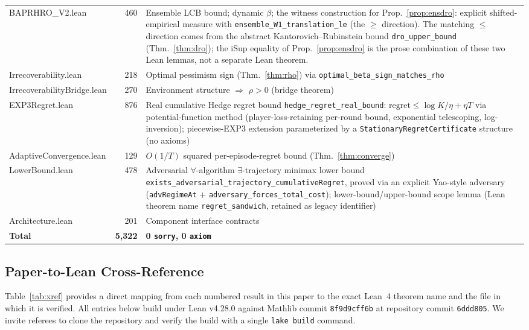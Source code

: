 \documentclass[11pt]{article}
\theoremstyle{definition}
\theoremstyle{remark}
\begin{document}
\begin{table}[!htbp]
\begin{tabular}{lrp{8.4cm}}
BAPRHRO\_V2.lean & 460 & Ensemble LCB bound; dynamic $\beta$; the witness construction for Prop.~\ref{prop:ensdro}: explicit shifted-empirical measure with \texttt{ensemble\_W1\_translation\_le} (the $\geq$ direction). The matching $\leq$ direction comes from the abstract Kantorovich--Rubinstein bound \texttt{dro\_upper\_bound} (Thm.~\ref{thm:dro}); the iSup equality of Prop.~\ref{prop:ensdro} is the prose combination of these two Lean lemmas, not a separate Lean theorem. \\
Irrecoverability.lean & 218 & Optimal pessimism sign (Thm.~\ref{thm:rho}) via \texttt{optimal\_beta\_sign\_matches\_rho} \\
IrrecoverabilityBridge.lean & 270 & Environment structure $\Rightarrow$ $\rho > 0$ (bridge theorem) \\
EXP3Regret.lean & 876 & Real cumulative Hedge regret bound \texttt{hedge\_regret\_real\_bound}: $\mathrm{regret} \leq \log K / \eta + \eta T$ via potential-function method (player-loss-retaining per-round bound, exponential telescoping, log-inversion); piecewise-EXP3 extension parameterized by a \texttt{StationaryRegretCertificate} structure (no axioms) \\
AdaptiveConvergence.lean & 129 & $O(1/T)$ squared per-episode-regret bound (Thm.~\ref{thm:converge}) \\
LowerBound.lean & 478 & Adversarial $\forall$-algorithm $\exists$-trajectory minimax lower bound \texttt{exists\_adversarial\_trajectory\_cumulativeRegret}, proved via an explicit Yao-style adversary (\texttt{advRegimeAt} + \texttt{adversary\_forces\_total\_cost}); lower-bound/upper-bound scope lemma (Lean theorem name \texttt{regret\_sandwich}, retained as legacy identifier) \\
Architecture.lean & 201 & Component interface contracts \\
\midrule
\textbf{Total} & \textbf{5{,}322} & \textbf{0 \texttt{sorry}, 0 \texttt{axiom}} \\
\bottomrule
\end{tabular}
\end{table}

\subsection{Paper-to-Lean Cross-Reference}
\label{sec:lean_xref}

Table~\ref{tab:xref} provides a direct mapping from each numbered
result in this paper to the exact Lean~4 theorem name and the file
in which it is verified. All entries below build under Lean v4.28.0
against Mathlib commit \texttt{8f9d9cff6b} at repository commit
\texttt{6ddd805}. We invite referees to clone the repository and
verify the build with a single \texttt{lake build} command.
\end{document}
